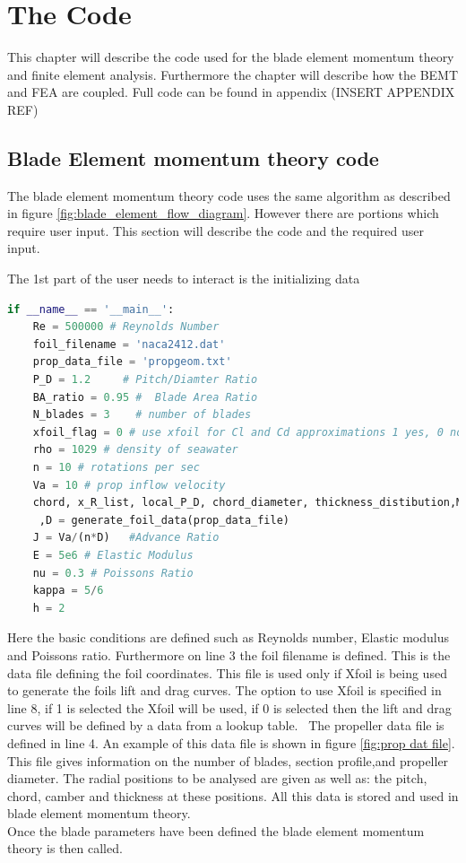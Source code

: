 \documentclass[]{report}
\begin{document}
\chapter{The Code}
This chapter will describe the code used for the blade element momentum theory and finite element analysis. Furthermore the chapter will describe how the BEMT and FEA are coupled. Full code can be found in appendix (INSERT APPENDIX REF)

\section{Blade Element momentum theory code}
The blade element momentum theory code uses the same algorithm as described in figure \ref{fig:blade_element_flow_diagram}. However there are portions which require user input. This section will describe the code and the required user input.

The 1st part of the user needs to interact is the initializing data

\begin{lstlisting}[language = Python]
if __name__ == '__main__':
	Re = 500000 # Reynolds Number
	foil_filename = 'naca2412.dat'
	prop_data_file = 'propgeom.txt'
	P_D = 1.2     # Pitch/Diamter Ratio
	BA_ratio = 0.95 #  Blade Area Ratio
	N_blades = 3    # number of blades
	xfoil_flag = 0 # use xfoil for Cl and Cd approximations 1 yes, 0 no
	rho = 1029 # density of seawater
	n = 10 # rotations per sec
	Va = 10 # prop inflow velocity
	chord, x_R_list, local_P_D, chord_diameter, thickness_distibution,MC,filename \\
	 ,D = generate_foil_data(prop_data_file)
	J = Va/(n*D)   #Advance Ratio
	E = 5e6 # Elastic Modulus
	nu = 0.3 # Poissons Ratio
	kappa = 5/6 
	h = 2 
\end{lstlisting}

Here the basic conditions are defined such as Reynolds number, Elastic modulus and Poissons ratio. Furthermore on line 3 the foil filename is defined. This is the data file defining the foil coordinates. This file is used only if Xfoil is being used to generate the foils lift and drag curves. The option to use Xfoil is specified in line 8, if 1 is selected the Xfoil will be used, if 0 is selected then the lift and drag curves will be defined by a data from a lookup table. \
The propeller data file is defined in line 4. An example of this data file is shown in figure \ref{fig:prop dat file}. This file gives information on the number of blades, section profile,and propeller diameter. The radial positions to be analysed are given as well as: the pitch, chord, camber and thickness at these positions. All this data is stored and used in blade element momentum theory. 
\\
Once the blade parameters have been defined the blade element momentum theory is then called.
\end{document}
